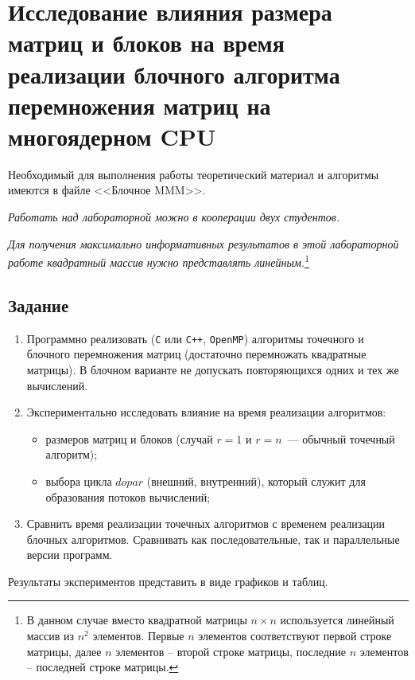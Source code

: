 

\section{Исследование влияния размера матриц и блоков на время реализации блочного алгоритма перемножения матриц на многоядерном CPU}

Необходимый для выполнения работы теоретический материал и алгоритмы имеются в файле <<Блочное MMM>>.

\textit{Работать над лабораторной можно в кооперации двух студентов.}

\textit{Для получения максимально информативных результатов в этой лабораторной работе квадратный массив нужно представлять линейным.}\footnote{В данном случае вместо квадратной матрицы $n \times n$ используется линейный массив из $n^2$ элементов. Первые $n$ элементов соответствуют первой строке матрицы, далее $n$ элементов -- второй строке матрицы, последние $n$ элементов -- последней строке матрицы.}

\subsection*{Задание}
\begin{enumerate}
    \item Программно реализовать (\texttt{С} или \texttt{C++}, \texttt{OpenMP}) алгоритмы точечного и блочного перемножения матриц (достаточно перемножать квадратные матрицы).
    В блочном варианте не допускать повторяющихся одних и тех же вычислений.
    \item Экспериментально исследовать влияние на время реализации алгоритмов:
    \begin{itemize}
        \item размеров матриц и блоков (случай $r=1$ и $r=n$~--- обычный точечный алгоритм);
        \item выбора цикла $dopar$ (внешний, внутренний), который служит для образования потоков вычислений;
    \end{itemize}
    \item Сравнить время реализации точечных алгоритмов с временем реализации блочных алгоритмов.
    Сравнивать как последовательные, так и параллельные версии программ.
\end{enumerate}

Результаты экспериментов представить в виде графиков и таблиц.

